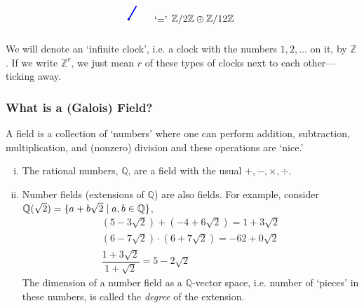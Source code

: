 \begin{frame}[plain]
\[\begin{tikzpicture}[scale=0.7]
        \draw[fill=blue] (0,0) circle (0.05);
        
        \draw[very thick,blue] (0,0) -- (0.4,0.693);
      
	\node at (1.65,0) {`$=$'};
	\node at (3.8,0) {$\mathbb{Z}/2\mathbb{Z} \oplus \mathbb{Z}/12\mathbb{Z}$};
        \end{tikzpicture}
        \] \par\vspace{0.3cm}
We will denote an `infinite clock', i.e. a clock with the numbers $1, 2, \ldots$ on it, by $\mathbb{Z}$. If we write $\mathbb{Z}^r$, we just mean $r$ of these types of clocks next to each other---ticking away. 
\end{frame}



\begin{frame}[plain] \frametitle{What is a (Galois) Field?} \footnotesize
\begin{dfn}[`Field']
A field is a collection of `numbers' where one can perform addition, subtraction, multiplication, and (nonzero) division and these operations are `nice.'
\end{dfn}

\begin{ex}
\begin{enumerate}[(i)]
\item The rational numbers, $\mathbb{Q}$, are a field with the usual $+, -, \times, \div$.
\item Number fields (extensions of $\mathbb{Q}$) are also fields. For example, consider $\mathbb{Q}(\sqrt{2})= \{ a + b \sqrt{2} \;|\; a, b \in \mathbb{Q} \}$,
	\[
	\begin{gathered}
	(5 - 3\sqrt{2}) + (-4 + 6 \sqrt{2})= 1 + 3 \sqrt{2} \\
	(6 - 7\sqrt{2}) \cdot (6 + 7\sqrt{2})= -62 + 0\sqrt{2} \\
	\dfrac{1 + 3\sqrt{2}}{1 + \sqrt{2}}= 5 - 2\sqrt{2}
	\end{gathered}
	\] 
The dimension of a number field as a $\mathbb{Q}$-vector space, i.e. number of `pieces' in these numbers, is called the \textit{degree} of the extension. 
\end{enumerate}
\end{ex}
\end{frame}



